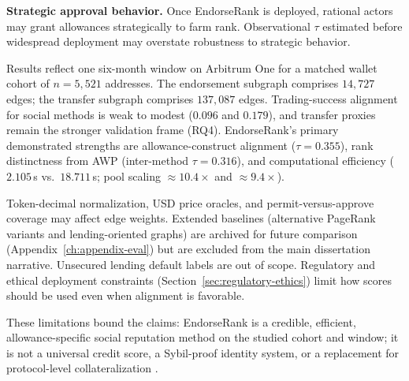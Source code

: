 \textbf{Strategic approval behavior.} Once EndorseRank is deployed, rational actors may grant allowances strategically to farm rank. Observational $\tau$ estimated before widespread deployment may overstate robustness to strategic behavior.


Results reflect one six-month window on Arbitrum One for a matched wallet cohort of $n=5{,}521$ addresses. The endorsement subgraph comprises $14{,}727$ edges; the transfer subgraph comprises $137{,}087$ edges. Trading-success alignment for social methods is weak to modest ($0.096$ and $0.179$), and transfer proxies remain the stronger validation frame (RQ4). EndorseRank's primary demonstrated strengths are allowance-construct alignment ($\tau=0.355$), rank distinctness from AWP (inter-method $\tau=0.316$), and computational efficiency ($2.105$\,s vs.\ $18.711$\,s; pool scaling $\approx 10.4\times$ and $\approx 9.4\times$).

Token-decimal normalization, USD price oracles, and permit-versus-approve coverage may affect edge weights. Extended baselines (alternative PageRank variants and lending-oriented graphs) are archived for future comparison (Appendix~\ref{ch:appendix-eval}) but are excluded from the main dissertation narrative. Unsecured lending default labels are out of scope. Regulatory and ethical deployment constraints (Section~\ref{sec:regulatory-ethics}) limit how scores should be used even when alignment is favorable.

These limitations bound the claims: EndorseRank is a credible, efficient, allowance-specific social reputation method on the studied cohort and window; it is not a universal credit score, a Sybil-proof identity system, or a replacement for protocol-level collateralization .
